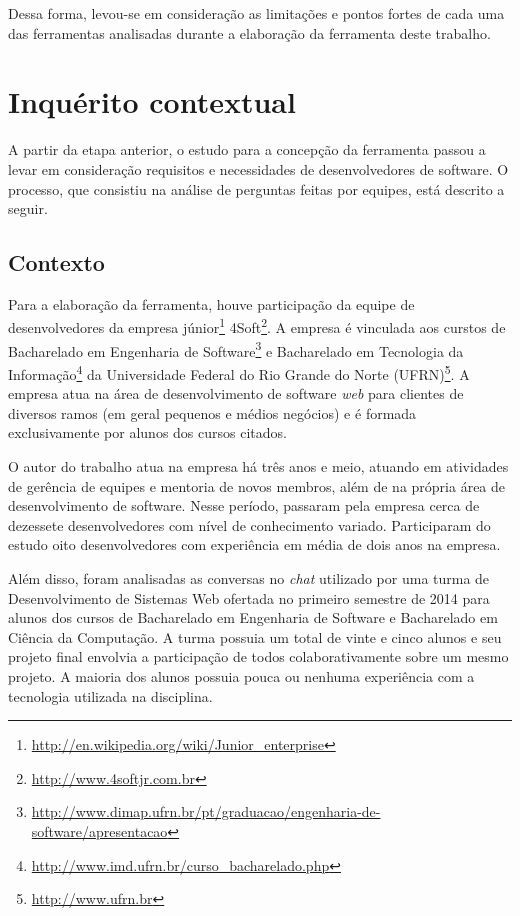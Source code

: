\bigskip

Dessa forma, levou-se em consideração as limitações e pontos fortes de cada uma das ferramentas analisadas durante a elaboração da ferramenta deste trabalho.

\section{Inquérito contextual}

A partir da etapa anterior, o estudo para a concepção da ferramenta passou a levar em consideração requisitos e necessidades de desenvolvedores de software. O processo, que consistiu na análise de perguntas feitas por equipes, está descrito a seguir.

\subsection{Contexto}

Para a elaboração da ferramenta, houve participação da equipe de desenvolvedores da empresa júnior\footnote{\url{http://en.wikipedia.org/wiki/Junior_enterprise}} 4Soft\footnote{\url{http://www.4softjr.com.br}}. A empresa é vinculada aos curstos de Bacharelado em Engenharia de Software\footnote{\url{http://www.dimap.ufrn.br/pt/graduacao/engenharia-de-software/apresentacao}} e Bacharelado em Tecnologia da Informação\footnote{\url{http://www.imd.ufrn.br/curso_bacharelado.php}} da Universidade Federal do Rio Grande do Norte (UFRN)\footnote{\url{http://www.ufrn.br}}. A empresa atua na área de desenvolvimento de software \textit{web} para clientes de diversos ramos (em geral pequenos e médios negócios) e é formada exclusivamente por alunos dos cursos citados.

O autor do trabalho atua na empresa há três anos e meio, atuando em atividades de gerência de equipes e mentoria de novos membros, além de na própria área de desenvolvimento de software. Nesse período, passaram pela empresa cerca de dezessete desenvolvedores com nível de conhecimento variado. Participaram do estudo oito desenvolvedores com experiência em média de dois anos na empresa.

Além disso, foram analisadas as conversas no \textit{chat} utilizado por uma turma de Desenvolvimento de Sistemas Web ofertada no primeiro semestre de 2014 para alunos dos cursos de Bacharelado em Engenharia de Software e Bacharelado em Ciência da Computação. A turma possuia um total de vinte e cinco alunos e seu projeto final envolvia a participação de todos colaborativamente sobre um mesmo projeto. A maioria dos alunos possuia pouca ou nenhuma experiência com a tecnologia utilizada na disciplina.

